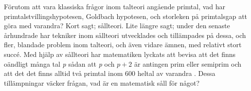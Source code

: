 



Förutom att vara klassiska frågor inom talteori angående primtal, vad har primtalstvillingshypotesen, Goldbach hypotesen, och storleken på primtalsgap att göra med varandra? Kort sagt; sållteori. Lite längre sagt; under den senaste århundrade har tekniker inom sållteori utvecklades och tillämpades på dessa, och fler, blandade problem inom talteori, och även vidare ämnen, med relativt stort succé. Med hjälp av sållteori har matematiken lyckats att bevisa att det finns oändligt många tal \textit{p} sådan att \textit{p} och \(p+2\) är antingen prim eller semiprim \cite{chen2Prime} och att det det finns alltid två primtal inom 600 heltal av varandra \cite{mayBound}. Dessa tillämpningar väcker frågan, vad är en matematisk såll för något? 

